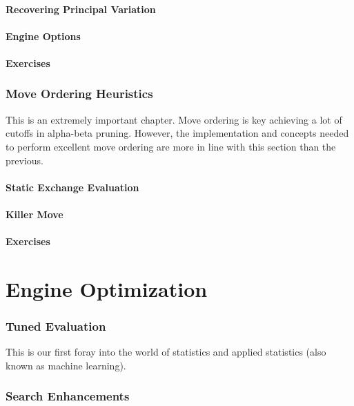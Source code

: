 \documentclass[letterpaper,11pt]{article}
\begin{document}
\subsection{Recovering Principal Variation}

\subsection{Engine Options}

\subsection{Exercises}
\section{Move Ordering Heuristics}

This is an extremely important chapter.
Move ordering is key achieving a lot of cutoffs in alpha-beta pruning. 
However, the implementation and concepts needed to perform
excellent move ordering are more in line with this section than the previous.

\subsection{Static Exchange Evaluation}
\subsection{Killer Move}
\subsection{Exercises}

\newpage
\part{Engine Optimization}

\section{Tuned Evaluation}

This is our first foray into the world of statistics and applied statistics (also known as machine learning).

\section{Search Enhancements}
\end{document}

